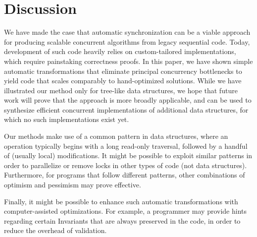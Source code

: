 \section{Discussion}\label{sec:discussion}

We have made the case that automatic synchronization can be a viable approach for producing scalable concurrent algorithms from legacy sequential code.
Today, development of such code heavily relies on custom-tailored implementations, which require painstaking correctness proofs. 
 In this paper, we have shown simple automatic transformations that eliminate principal concurrency bottlenecks  to yield code that scales comparably  to hand-optimized solutions.
While we have illustrated our method only for tree-like data structures, we hope that future work will prove that the approach is more broadly applicable, and can be used to 
synthesize efficient concurrent implementations of additional data structures, for which no such implementations exist yet. 

Our methods make use of a common pattern in data structures, where an operation typically begins with a long read-only traversal, followed by a handful of (usually local) modifications. 
It might be possible to exploit similar patterns in order to parallelize or remove locks in other types of code (not data structures).
Furthermore, for programs that follow different patterns, other combinations of optimism and pessimism may prove effective.

Finally, it might be possible to enhance such automatic transformations with computer-assisted optimizations. For example, a programmer may provide hints regarding certain 
Invariants that are always preserved in the code, in order to reduce the overhead of validation. 